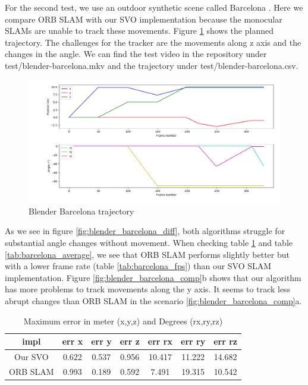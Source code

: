 \documentclass[11pt,a4paper,titlepage,oneside]{report}
\begin{document}
For the second test, we use an outdoor synthetic scene called Barcelona \cite{blender}. Here we compare ORB SLAM with our SVO implementation because the monocular SLAMs are unable to track these movements. Figure \ref{fig:blender_barcelona_traj} shows the planned trajectory. The challenges for the tracker are the movements along z axis and the changes in the angle. We can find the test video in the repository under test/blender-barcelona.mkv and the trajectory under test/blender-barcelona.csv.

\begin{figure}[H]
  \includegraphics[width=1.0\textwidth]{img/blender_barcelona_traj.png}
  \caption{Blender Barcelona trajectory}\label{fig:blender_barcelona_traj}
\end{figure}

As we see in figure \ref{fig:blender_barcelona_diff}, both algorithms struggle for substantial angle changes without movement. When checking table \ref{tab:barcelona_maximas} and table \ref{tab:barcelona_average}, we see that ORB SLAM performs slightly better but with a lower frame rate (table \ref{tab:barcelona_fps}) than our SVO SLAM implementation. Figure \ref{fig:blender_barcelona_comp}b shows that our algorithm has more problems to track movements along the y axis. It seems to track less abrupt changes than ORB SLAM in the scenario \ref{fig:blender_barcelona_comp}a.

\begin{table}[H]
  \centering
  \begin{tabular}{|c|c|c|c|c|c|c|}
  impl & err x & err y & err z & err rx & err ry & err rz\\
  \hline
  Our SVO & 0.622 & 0.537 & 0.956 & 10.417 & 11.222 & 14.682\\
  ORB SLAM& 0.993 & 0.189 & 0.592 & 7.491 & 19.315 & 10.542
\end{tabular}
\caption{Maximum error in meter (x,y,z) and Degrees (rx,ry,rz)}
\label{tab:barcelona_maximas}
\end{table}
\end{document}
